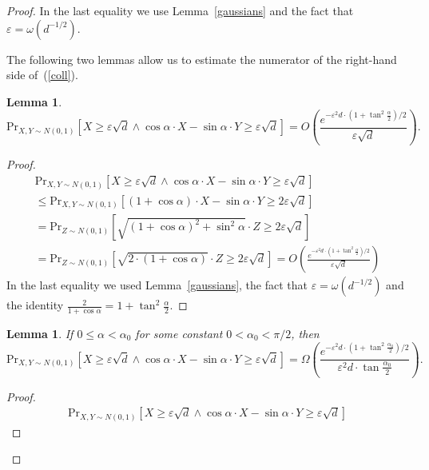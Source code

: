 \documentclass[11pt,letterpaper]{article}
\newtheorem{lemma}[theorem]{Lemma}
\newcommand{\eps}{\varepsilon}
\begin{document}
\begin{proof}
    In the last equality we use Lemma~\ref{gaussians} and the fact that $\eps = \omega(d^{-1/2})$.

    The following two lemmas allow us to estimate the numerator of the
    right-hand side of~(\ref{coll}).

    \begin{lemma}
        \label{numerator_up}
        $$
            \mathrm{Pr}_{X, Y \sim N(0, 1)}[X \geq \eps \sqrt{d} \wedge \cos \alpha \cdot X - \sin \alpha \cdot Y \geq \eps \sqrt{d}]
            = O\left(\frac{e^{-\eps^2 d \cdot (1 + \tan^2 \frac{\alpha}{2}) / 2}}{\eps \sqrt{d}}\right).
        $$
    \end{lemma}
    \begin{proof}
        \begin{multline*}
            \mathrm{Pr}_{X, Y \sim N(0, 1)}[X \geq \eps \sqrt{d} \wedge \cos \alpha \cdot X - \sin \alpha \cdot Y \geq \eps \sqrt{d}]
            \\ \leq \mathrm{Pr}_{X, Y \sim N(0, 1)}[(1 + \cos \alpha) \cdot X - \sin \alpha \cdot Y \geq 2 \eps \sqrt{d}]
            \\ = \mathrm{Pr}_{Z \sim N(0, 1)}[ \sqrt{(1 + \cos \alpha)^2 + \sin^2 \alpha} \cdot Z \geq 2 \eps \sqrt{d}]
            \\ = \mathrm{Pr}_{Z \sim N(0, 1)}[\sqrt{2 \cdot (1 + \cos \alpha)} \cdot Z \geq 2 \eps \sqrt{d}]
             = O\left(\frac{e^{-\eps^2 d \cdot (1 + \tan^2 \frac{\alpha}{2}) / 2}}{\eps \sqrt{d}} \right)
        \end{multline*}
        In the last equality we used Lemma~\ref{gaussians}, the fact that $\eps = \omega(d^{-1/2})$ and the identity
        $            \frac{2}{1 + \cos \alpha} = 1 + \tan^2 \frac{\alpha}{2}.
        $
    \end{proof}
    \begin{lemma}
        \label{numerator_lo}
        If $0 \leq \alpha < \alpha_0$ for some \emph{constant} $0 < \alpha_0 < \pi / 2$, then
        $$
            \mathrm{Pr}_{X, Y \sim N(0, 1)}[X \geq \eps \sqrt{d} \wedge \cos \alpha \cdot X - \sin \alpha \cdot Y \geq \eps \sqrt{d}]
            = \Omega\left(\frac{e^{-\eps^2 d \cdot (1 + \tan^2 \frac{\alpha_0}{2}) / 2}}{\eps^2 d \cdot \tan \frac{\alpha_0}{2}}\right).
        $$
    \end{lemma}
    \begin{proof}
        \begin{multline*}
            \mathrm{Pr}_{X, Y \sim N(0, 1)}[X \geq \eps \sqrt{d} \wedge \cos \alpha \cdot X - \sin \alpha \cdot Y \geq \eps \sqrt{d}]

\end{multline*}
\end{proof}
\end{proof}
\end{document}
